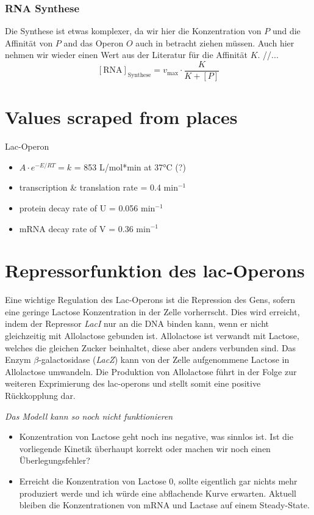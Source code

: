 \documentclass{article}
\begin{document}
\subsubsection{RNA Synthese}
Die Synthese ist etwas komplexer, da wir hier die Konzentration von $P$ und die Affinität von $P$ and das Operon $O$ auch in betracht ziehen müssen. Auch hier nehmen wir wieder einen Wert aus der Literatur\cite{lacoperon} für die Affinität $K$. //...
\begin{equation} \label{eq:3}
    [\text{RNA}]_{\text{Synthese}}=v_{\text{max}} \cdot \frac{K}{K+[P]}
\end{equation}

\newpage
\section{Values scraped from places}
Lac-Operon\cite{lacoperon}
\begin{itemize}
    \item $A \cdot e^{-E/RT} = k$ = 853 L/mol*min at 37°C (?)
    \item transcription \& translation rate = 0.4 min$^{-1}$
    \item protein decay rate of U = 0.056 min$^{-1}$
    \item mRNA decay rate of V = 0.36 min$^{-1}$
\end{itemize}

\section*{Repressorfunktion des lac-Operons}

Eine wichtige Regulation des Lac-Operons ist die Repression des Gens, sofern eine geringe Lactose Konzentration in der Zelle vorherrscht. Dies wird erreicht, indem der Repressor \emph{LacI} nur an die DNA binden kann, wenn er nicht gleichzeitig mit Allolactose gebunden ist. Allolactose ist verwandt mit Lactose, welches die gleichen Zucker beinhaltet, diese aber anders verbunden sind. Das Enzym $\beta$-galactosidase (\emph{LacZ}) kann von der Zelle aufgenommene Lactose in Allolactose umwandeln. Die Produktion von Allolactose führt in der Folge zur weiteren Exprimierung des lac-operons und stellt somit eine positive Rückkopplung dar.
\par

\emph{Das Modell kann so noch nicht funktionieren}
\begin{itemize}
    \item Konzentration von Lactose geht noch ins negative, was sinnlos ist. Ist die vorliegende Kinetik überhaupt korrekt oder machen wir noch einen Überlegungsfehler?
    \item Erreicht die Konzentration von Lactose 0, sollte eigentlich gar nichts mehr produziert werde und ich würde eine abflachende Kurve erwarten. Aktuell bleiben die Konzentrationen von mRNA und Lactase auf einem Steady-State.
\end{itemize}
\end{document}
